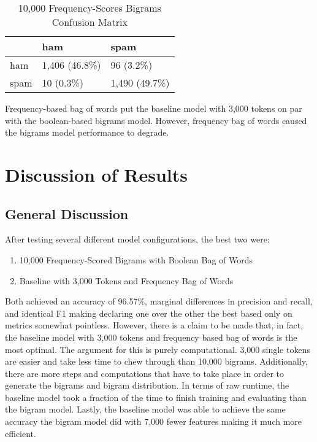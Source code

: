 \documentclass[a4paper]{article}
\begin{document}
	\begin{table}[H]
		\centering
		\caption{10,000 Frequency-Scores Bigrams Confusion Matrix}
		\begin{tabular}{l|ll}
			& ham & spam \\
			\hline
			ham & 1,406 (46.8\%) & 96 (3.2\%) \\
			spam & 10 (0.3\%) & 1,490 (49.7\%)
		\end{tabular}
	\end{table}

	Frequency-based bag of words put the baseline model with 3,000 tokens on par with the boolean-based bigrams model. However, frequency bag of words caused the bigrams model performance to degrade.
	
	\section{Discussion of Results}
	
	\subsection{General Discussion}
	
	After testing several different model configurations, the best two were:
	
	\begin{enumerate}
		\item 10,000 Frequency-Scored Bigrams with Boolean Bag of Words
		\item Baseline with 3,000 Tokens and Frequency Bag of Words
	\end{enumerate}

	Both achieved an accuracy of 96.57\%, marginal differences in precision and recall, and identical F1 making declaring one over the other the best based only on metrics somewhat pointless. However, there is a claim to be made that, in fact, the baseline model with 3,000 tokens and frequency based bag of words is the most optimal. The argument for this is purely computational. 3,000 single tokens are easier and take less time to chew through than 10,000 bigrams. Additionally, there are more steps and computations that have to take place in order to generate the bigrams and bigram distribution. In terms of raw runtime, the baseline model took a fraction of the time to finish training and evaluating than the bigram model. Lastly, the baseline model was able to achieve the same accuracy the bigram model did with 7,000 fewer features making it much more efficient. 
	
\end{document}
